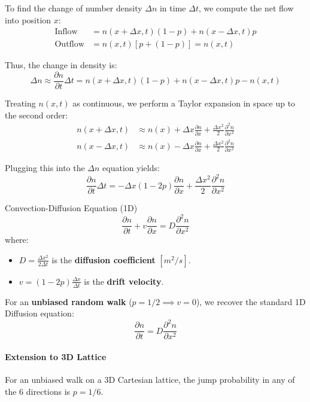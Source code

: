To find the change of number density $\Delta n$ in time $\Delta t$, we compute the net flow into position $x$:
\begin{align*}
\text{Inflow} &= n(x+\Delta x, t)(1-p) + n(x-\Delta x, t)p \\
\text{Outflow} &= n(x, t)[p + (1-p)] = n(x, t)
\end{align*}

Thus, the change in density is:
\[
\Delta n \approx \frac{\partial n}{\partial t} \Delta t = n(x+\Delta x, t)(1-p) + n(x-\Delta x, t)p - n(x, t)
\]

Treating $n(x,t)$ as continuous, we perform a Taylor expansion in space up to the second order:
\begin{align*}
n(x+\Delta x, t) &\approx n(x) + \Delta x\frac{\partial n}{\partial x} + \frac{\Delta x^{2}}{2}\frac{\partial^{2}n}{\partial x^{2}} \\
n(x-\Delta x, t) &\approx n(x) - \Delta x\frac{\partial n}{\partial x} + \frac{\Delta x^{2}}{2}\frac{\partial^{2}n}{\partial x^{2}}
\end{align*}

Plugging this into the $\Delta n$ equation yields:
\[
\frac{\partial n}{\partial t} \Delta t = -\Delta x(1-2p)\frac{\partial n}{\partial x} + \frac{\Delta x^{2}}{2}\frac{\partial^{2}n}{\partial x^{2}}
\]

\begin{eqbox}{Convection-Diffusion Equation (1D)}
\[
\frac{\partial n}{\partial t} + v\frac{\partial n}{\partial x} = D\frac{\partial^{2}n}{\partial x^{2}}
\]
where:
\begin{itemize}
    \item $D = \frac{\Delta x^{2}}{2\Delta t}$ is the \textbf{diffusion coefficient} $[m^2/s]$.
    \item $v = (1-2p)\frac{\Delta x}{\Delta t}$ is the \textbf{drift velocity}.
\end{itemize}
\end{eqbox}

For an \textbf{unbiased random walk} ($p = 1/2 \implies v=0$), we recover the standard 1D Diffusion equation:
\[
\frac{\partial n}{\partial t} = D\frac{\partial^{2}n}{\partial x^{2}}
\]

\paragraph{Extension to 3D Lattice}
For an unbiased walk on a 3D Cartesian lattice, the jump probability in any of the 6 directions is $p=1/6$.

